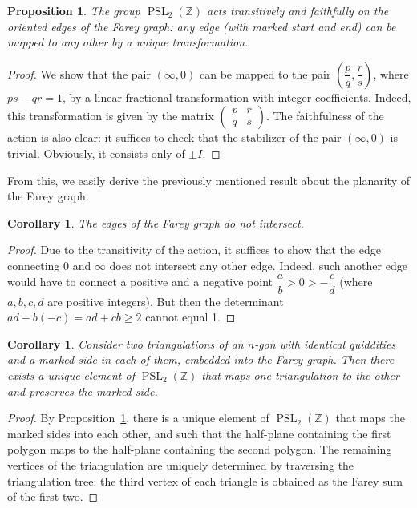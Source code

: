 \documentclass[a4paper,11pt]{amsart}
\newcommand{\ZZ}{{\mathbb{Z}}}
\newcommand{\PSL}{\mathop{\mathrm{PSL}}}
\theoremstyle{plain}
\newtheorem{prop}[theorem]{Proposition}
\newtheorem{corollary}[theorem]{Corollary}
\theoremstyle{remark}
\theoremstyle{definition}
\numberwithin{equation}{section}
\numberwithin{figure}{section}
\begin{document}
\begin{prop}\label{pr:transit} The group $\PSL_2(\ZZ)$ acts transitively and faithfully on the oriented edges of the Farey graph: any edge (with marked start and end) can be mapped to any other by a unique transformation.
\end{prop}

\begin{proof}
We show that the pair $(\infty,0)$ can be mapped to the pair $\left(\dfrac pq,\dfrac rs\right)$, where $ps-qr=1$, by a linear-fractional transformation with integer coefficients. Indeed, this transformation is given by the matrix $\begin{pmatrix}p &r\\q&s\end{pmatrix}$. The faithfulness of the action is also clear: it suffices to check that the stabilizer of the pair $(\infty,0)$ is trivial. Obviously, it consists only of $\pm I$.
\end{proof}

From this, we easily derive the previously mentioned result about the planarity of the Farey graph.

\begin{corollary}\label{cor:planar} The edges of the Farey graph do not intersect.
\end{corollary}

\begin{proof} Due to the transitivity of the action, it suffices to show that the edge connecting $0$ and $\infty$ does not intersect any other edge. Indeed, such another edge would have to connect a positive and a negative point $\dfrac ab>0>-\dfrac cd$ (where $a,b,c,d$ are positive integers). But then the determinant $ad-b(-c)=ad+cb\geq 2$ cannot equal 1.
\end{proof}

\begin{corollary}\label{cor:transit}
Consider two triangulations of an $n$-gon with identical quiddities and a marked side in each of them, embedded into the Farey graph. Then there exists a unique element of $\PSL_2(\ZZ)$ that maps one triangulation to the other and preserves the marked side.
\end{corollary}

\begin{proof} By Proposition~\ref{pr:transit}, there is a unique element of $\PSL_2(\ZZ)$ that maps the marked sides into each other, and such that the half-plane containing the first polygon maps to the half-plane containing the second polygon. The remaining vertices of the triangulation are uniquely determined by traversing the triangulation tree: the third vertex of each triangle is obtained as the Farey sum of the first two.
\end{proof}
\end{document}

